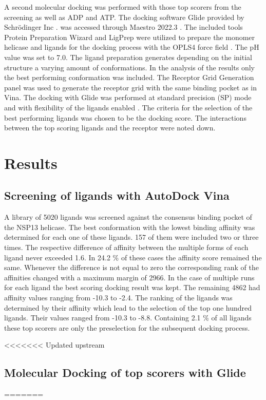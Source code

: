 \documentclass[11pt, letterpaper, titlepage]{article}
\renewcommand{\cite}{\parencite}
\begin{document}
A second molecular docking was performed with those top scorers from the screening as well as ADP and ATP. The docking software Glide provided by Schrödinger Inc \cite{Friesner2004}. was accessed through Maestro 2022.3 \cite{Maestro2022}. The included tools Protein Preparation Wizard and LigPrep \cite{Madhavi2013} were utilized to prepare the monomer helicase and ligands for the docking process with the OPLS4 force field \cite{Lu2021}. The pH value was set to 7.0. The ligand preparation generates depending on the initial structure a varying amount of conformations. In the analysis of the results only the best performing conformation was included. The Receptor Grid Generation panel was used to generate the receptor grid with the same binding pocket as in \ac{Vina}. The docking with Glide was performed at standard precision (SP) mode and with flexibility of the ligands enabled \cite{Halgren.2004}. The criteria for the selection of the best performing ligands was chosen to be the docking score. The interactions between the top scoring ligands and the receptor were noted down. 


\section{Results}

\subsection{Screening of ligands with AutoDock Vina}
A library of 5020 ligands was screened against the consensus binding pocket of the NSP13 helicase. The best conformation with the lowest binding affinity was determined for each one of these ligands. 157 of them were included two or three times. The respective difference of affinity between the multiple forms of each ligand never exceeded 1.6. In 24.2 \% of these cases the affinity score remained the same. Whenever the difference is not equal to zero the corresponding rank of the affinities changed with a maximum margin of 2966. In the case of multiple runs for each ligand the best scoring docking result was kept. The remaining 4862 had affinity values ranging from -10.3 to -2.4. The ranking of the ligands was determined by their affinity which lead to the selection of the top one hundred ligands. Their values ranged from -10.3 to -8.8. Containing 2.1 \% of all ligands these top scorers are only the preselection for the subsequent docking process. 

<<<<<<< Updated upstream
\subsection{Molecular Docking of top scorers with Glide}
=======
\end{document}
